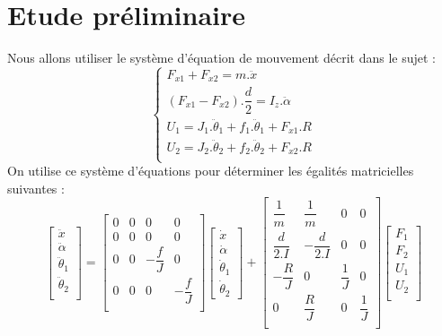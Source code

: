\documentclass[a4paper]{article}
\begin{document}
	\section{Etude préliminaire}
	Nous allons utiliser le système d'équation de mouvement décrit dans le sujet :
	$$
	\begin{cases}
		F_{x1} + F_{x2} = m.\ddot{x}\\
		(F_{x1} - F_{x2}).\dfrac{d}{2} = I_{z}.\ddot{\alpha}\\
		U_{1} = J_{1}.\ddot{\theta}_{1} + f_{1}.\ddot{\theta}_{1} + F_{x1}.R\\
		U_{2} = J_{2}.\ddot{\theta}_{2} + f_{2}.\ddot{\theta}_{2} + F_{x2}.R\\
	\end{cases}
	$$
	On utilise ce système d'équations pour déterminer les égalités matricielles suivantes :
	\begin{equation}
	\begin{bmatrix}
	\ddot{x} \\
	\ddot{\alpha} \\
	\ddot{\theta}_{1} \\
	\ddot{\theta}_{2} \\
	\end{bmatrix}
	=
	\begin{bmatrix}
	0 & 0 & 0 & 0 \\
	0 & 0 & 0 & 0 \\
	0 & 0 & -\dfrac{f}{J} & 0 \\
	0 & 0 & 0 & -\dfrac{f}{J} \\
	\end{bmatrix}
	\begin{bmatrix}
	\dot{x} \\
	\dot{\alpha} \\
	\dot{\theta}_{1} \\
	\dot{\theta}_{2}
	\end{bmatrix}
	+
	\begin{bmatrix}
	\dfrac{1}{m} & \dfrac{1}{m} & 0 & 0 \\
	\dfrac{d}{2.I} & -\dfrac{d}{2.I} & 0 & 0 \\
	-\dfrac{R}{J} & 0 & \dfrac{1}{J} & 0 \\
	0 & \dfrac{R}{J} & 0 & \dfrac{1}{J} \\
	\end{bmatrix}
	\begin{bmatrix}
	F_{1} \\
	F_{2} \\
	U_{1} \\
	U_{2} \\
	\end{bmatrix}
	\end{equation}
\end{document}
